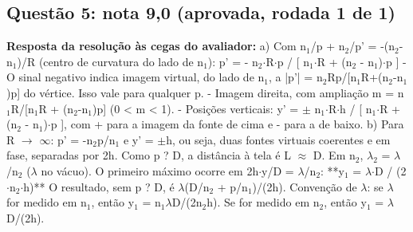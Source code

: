 \documentclass{article}%
\begin{document}
\subsection*{Questão 5: nota 9,0 (aprovada, rodada 1 de 1)}%
\textbf{Resposta da resolução às cegas do avaliador:} a) Com n$_{1}$/p + n$_{2}$/p' = -(n$_{2}$-n$_{1}$)/R (centro de curvatura do lado de n$_{1}$):\newline%
\newline%
p' = - n$_{2}$$\cdot$R$\cdot$p / {[} n$_{1}$$\cdot$R + (n$_{2}$ - n$_{1}$)$\cdot$p {]}\newline%
\newline%
{-} O sinal negativo indica imagem virtual, do lado de n$_{1}$, a |p'| = n$_{2}$Rp/{[}n$_{1}$R+(n$_{2}$-n$_{1}$)p{]} do vértice. Isso vale para qualquer p.\newline%
{-} Imagem direita, com ampliação m = n$_{1}$R/{[}n$_{1}$R + (n$_{2}$-n$_{1}$)p{]} (0 < m < 1).\newline%
{-} Posições verticais: y' = $\pm$ n$_{1}$$\cdot$R$\cdot$h / {[} n$_{1}$$\cdot$R + (n$_{2}$ - n$_{1}$)$\cdot$p {]}, com + para a imagem da fonte de cima e - para a de baixo.\newline%
\newline%
b) Para R $\to$ $\infty$: p' = -n$_{2}$p/n$_{1}$ e y' = $\pm$h, ou seja, duas fontes virtuais coerentes e em fase, separadas por 2h. Como p ? D, a distância à tela é L $\approx$ D. Em n$_{2}$, $\lambda$$_{2}$ = $\lambda$/n$_{2}$ ($\lambda$ no vácuo). O primeiro máximo ocorre em 2h$\cdot$y/D = $\lambda$/n$_{2}$:\newline%
\newline%
**y$_{1}$ = $\lambda$$\cdot$D / (2$\cdot$n$_{2}$$\cdot$h)**\newline%
\newline%
O resultado, sem p ? D, é $\lambda$(D/n$_{2}$ + p/n$_{1}$)/(2h).\newline%
\newline%
Convenção de $\lambda$: se $\lambda$ for medido em n$_{1}$, então y$_{1}$ = n$_{1}$$\lambda$D/(2n$_{2}$h). Se for medido em n$_{2}$, então y$_{1}$ = $\lambda$D/(2h).\par %
\end{document}
